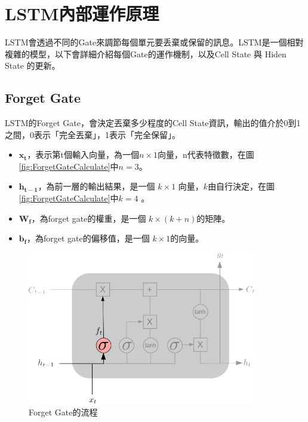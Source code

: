\newpage

\section{LSTM內部運作原理}

LSTM會透過不同的Gate來調節每個單元要丢棄或保留的訊息。LSTM是一個相對複雜的模型，以下會詳細介紹每個Gate的運作機制，以及Cell State 與 Hiden State 的更新。



\subsection{Forget Gate}

LSTM的Forget Gate，會決定丟棄多少程度的Cell State資訊，輸出的值介於0到1之間，0表示「完全丟棄」，1表示「完全保留」。

\begin{itemize}
	\item 
		\(\mathbf{x_t}\)，表示第t個輸入向量，為一個\(n\times 1\)向量，n代表特徵數，在圖 \ref{fig:ForgetGateCalculate}中\(n = 3\)。

	\item 
		\(\mathbf{h_{t-1}}\)，為前一層的輸出結果，是一個 \(k \times 1\) 向量，\(k\)由自行決定，在圖 \ref{fig:ForgetGateCalculate}中\(k = 4\) 。

	\item 
		\(\mathbf{W_f}\)，為forget gate的權重，是一個 \(k \times (k+n)\)的矩陣。

	\item 
		\(\mathbf{b_f}\)，為forget gate的偏移值，是一個 \(k \times 1\)的向量。
\end{itemize}



\begin{figure}[H]
	\centering
	\includegraphics[width=10cm]{./pic/DR88VjoI.png}
	\caption{Forget Gate的流程}
	\label{fig:ForgetGate}
\end{figure}

